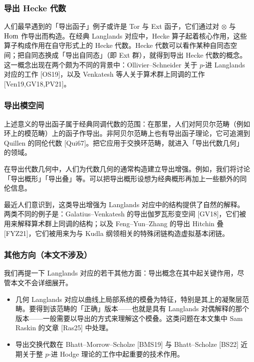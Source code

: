 \subsubsection{导出 Hecke 代数}

人们最早遇到的「导出函子」例子或许是 Tor 与 Ext 函子，它们通过对 $\otimes$ 与 $\operatorname{Hom}$ 作导出而构造。在经典 Langlands 对应中，Hecke 算子起着核心作用，这些算子构成作用在自守形式上的 Hecke 代数。Hecke 代数可以看作某种自同态空间；把自同态换成「导出自同态」（即 Ext 群），就得到导出 Hecke 代数的概念。这一概念出现在两个颇为不同的背景中：Ollivier--Schneider 关于 $p$-进 Langlands 对应的工作 [OS19]，以及 Venkatesh 等人关于算术群上同调的工作 [Ven19,GV18,PV21]。

\subsubsection{导出模空间}

上述意义的导出函子属于经典同调代数的范围：在那里，人们对阿贝尔范畴（例如环上的模范畴）上的函子作导出。非阿贝尔范畴上也有导出函子理论，它可追溯到 Quillen 的同伦代数 [Qui67]。把它应用于交换环范畴，就进入「导出代数几何」的领域。

在导出代数几何中，人们为代数几何的通常构造建立导出增强。例如，我们将讨论「导出概形」「导出叠」等。可以把导出概形设想为经典概形再加上一些额外的同伦信息。

最近人们意识到，这类导出增强为 Langlands 对应中的结构提供了自然的解释。两类不同的例子是：Galatius--Venkatesh 的导出伽罗瓦形变空间 [GV18]，它们被用来解释算术群上同调的结构；以及 Feng--Yun--Zhang 的导出 Hitchin 叠 [FYZ21]，它们被用来为与 Kudla 纲领相关的特殊闭链构造虚拟基本闭链。

\subsubsection{其他方向（本文不涉及）}

我们再提一下 Langlands 对应的若干其他方面：导出概念在其中起关键作用，尽管本文不会详细展开。

\begin{itemize}[leftmargin=1.6em]
\item 几何 Langlands 对应以曲线上局部系统的模叠为特征，特别是其上的凝聚层范畴。要得到该范畴的「正确」版本——也就是具有 Langlands 对偶解释的那个版本——一般需要以导出的方式来理解这个模叠。这类问题在本文集中 Sam Raskin 的文章 [Ras25] 中处理。
\item 导出交换代数在 Bhatt--Morrow--Scholze [BMS19] 与 Bhatt--Scholze [BS22] 近期关于整 $p$-进 Hodge 理论的工作中起重要的技术作用。
\end{itemize}

